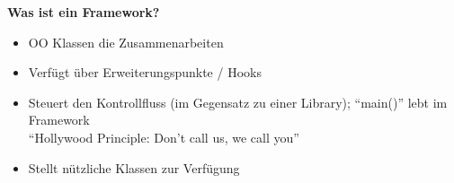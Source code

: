 \textbf{Was ist ein Framework?}

\begin{itemize}
	\item OO Klassen die Zusammenarbeiten
	\item Verfügt über Erweiterungspunkte / Hooks
	\item Steuert den Kontrollfluss (im Gegensatz zu einer Library); ``main()'' lebt im Framework \\
		``Hollywood Principle: Don't call us, we call you''
	\item Stellt nützliche Klassen zur Verfügung
\end{itemize}